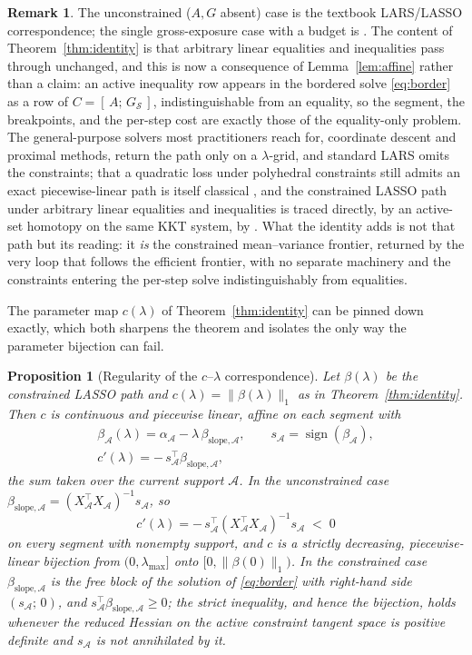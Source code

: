 \documentclass[sts]{imsart}
\newcommand{\Aset}{\mathcal{A}}
\newcommand{\Sset}{\mathcal{S}}
\newcommand{\trans}{^{\top}}
\theoremstyle{plain}
\newtheorem{proposition}{Proposition}
\theoremstyle{definition}
\newtheorem{remark}{Remark}
\begin{document}
\begin{remark}
The unconstrained ($A,G$ absent) case is the textbook LARS/LASSO correspondence; the
single gross-exposure case with a budget is \citet{brodie2009}. The content of
Theorem~\ref{thm:identity} is that arbitrary linear equalities and inequalities pass
through unchanged, and this is now a consequence of Lemma~\ref{lem:affine} rather than
a claim: an active inequality row appears in the bordered solve \eqref{eq:border} as a
row of $C=[\,A;\,G_{\Sset}\,]$, indistinguishable from an equality, so the segment, the
breakpoints, and the per-step cost are exactly those of the equality-only problem.
The general-purpose solvers most practitioners reach for, coordinate descent and
proximal methods, return the path only on a $\lambda$-grid, and standard LARS omits the
constraints; that a quadratic loss under polyhedral constraints still admits an exact
piecewise-linear path is itself classical \citep{rosset2007}, and the constrained LASSO
path under arbitrary linear equalities and inequalities is traced directly, by an
active-set homotopy on the same KKT system, by \citet{gaines2018}. What the identity
adds is not that path but its reading: it \emph{is} the constrained mean--variance
frontier, returned by the very loop that follows the efficient frontier, with no
separate machinery and the constraints entering the per-step solve indistinguishably
from equalities.
\end{remark}

The parameter map $c(\lambda)$ of Theorem~\ref{thm:identity} can be pinned down
exactly, which both sharpens the theorem and isolates the only way the parameter
bijection can fail.

\begin{proposition}[Regularity of the $c$--$\lambda$ correspondence]
\label{prop:reg}
Let $\beta(\lambda)$ be the constrained LASSO path and
$c(\lambda)=\|\beta(\lambda)\|_1$ as in Theorem~\ref{thm:identity}. Then $c$ is
continuous and piecewise linear, affine on each segment with
\[
\begin{gathered}
\beta_\Aset(\lambda) = \alpha_\Aset - \lambda\,\beta_{\mathrm{slope},\Aset},
\qquad s_\Aset = \operatorname{sign}(\beta_\Aset), \\
c'(\lambda) = -\,s_\Aset\trans \beta_{\mathrm{slope},\Aset},
\end{gathered}
\]
the sum taken over the current support $\Aset$. In the unconstrained case
$\beta_{\mathrm{slope},\Aset} = (X_\Aset\trans X_\Aset)^{-1} s_\Aset$, so
\[
c'(\lambda) = -\, s_\Aset\trans (X_\Aset\trans X_\Aset)^{-1} s_\Aset \;<\; 0
\]
on every segment with nonempty support, and $c$ is a strictly decreasing,
piecewise-linear bijection from $(0,\lambda_{\max}]$ onto $[0,\|\beta(0)\|_1)$. In the
constrained case $\beta_{\mathrm{slope},\Aset}$ is the free block of the solution of
\eqref{eq:border} with right-hand side $(s_\Aset;\,0)$, and
$s_\Aset\trans\beta_{\mathrm{slope},\Aset}\ge 0$; the strict inequality, and hence the
bijection, holds whenever the reduced Hessian on the active constraint tangent space is
positive definite and $s_\Aset$ is not annihilated by it.
\end{proposition}
\end{document}
